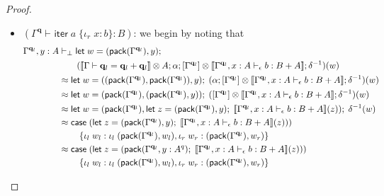 \documentclass[acmsmall,screen,review]{acmart}
\newcommand{\mb}[1]{\ensuremath{\mathbf{#1}}}
\newcommand{\ms}[1]{\ensuremath{\mathsf{#1}}}
\newcommand{\lto}{:}
\newcommand{\linl}[1]{\iota_l\;{#1}}
\newcommand{\linr}[1]{\iota_r\;{#1}}
\newcommand{\letexpr}[3]{\ensuremath{\ms{let}\;#1 = #2;\;#3}}
\newcommand{\caseexpr}[5]{\ms{case}\;#1\;\{\linl{#2} \lto #3, \linr{#4} \lto #5\}}
\newcommand{\liter}[3]{\ms{iter}\;#1\;\{ \linr{#2} \lto #3 \}}
\newcommand{\qsp}[4]{#1 \vdash #2 = #3 + #4}
\newcommand{\hasty}[4]{#1 \vdash_{#2} #3: {#4}}
\newcommand{\dnt}[1]{\llbracket{#1}\rrbracket}
\begin{document}
\begin{proof}
\begin{itemize}
    \item $(\hasty{\Gamma^{\mb{q}}}{}{\liter{a}{x}{b}}{B})$: we begin by noting that
    \begin{align*}
    \Gamma^{\mb{q}_l}, y : A &\vdash_\bot
      \letexpr{w}{(\ms{pack}(\Gamma^{\mb{q}_l}), y)}{ \\ & \qquad
        (
          \dnt{\qsp{\Gamma}{\mb{q}_l}{\mb{q}_l}{\mb{q}_l}} \otimes A 
          ; \alpha
          ; [\Gamma^{\mb{q}_l}] 
            \otimes \dnt{\hasty{\Gamma^{\mb{q}_l}, x : A}{\epsilon}{b}{B + A}}
          ; \delta^{-1}
        )(w)
      } \\
      &\approx
      \letexpr{w}{((\ms{pack}(\Gamma^{\mb{q}_l}), \ms{pack}(\Gamma^{\mb{q}_l})), y)}{ (
        \alpha
        ; [\Gamma^{\mb{q}_l}] 
          \otimes \dnt{\hasty{\Gamma^{\mb{q}_l}, x : A}{\epsilon}{b}{B + A}}
        ; \delta^{-1}
      )(w)} \\  
      &\approx
      \letexpr{w}{(\ms{pack}(\Gamma^{\mb{q}_l}), (\ms{pack}(\Gamma^{\mb{q}_l}), y))}{ (
        [\Gamma^{\mb{q}_l}] \otimes \dnt{\hasty{\Gamma^{\mb{q}_l}, x : A}{\epsilon}{b}{B + A}}
        ; \delta^{-1}
      )(w)} \\  
      &\approx
      \letexpr{w}{(\ms{pack}(\Gamma^{\mb{q}_l}), 
          \letexpr{z}{(\ms{pack}(\Gamma^{\mb{q}_l}), y)}
            {\dnt{\hasty{\Gamma^{\mb{q}_l}, x : A}{\epsilon}{b}{B + A}}(z)}
        )}{\delta^{-1}(w)} \\
      &\approx
      \caseexpr{(\letexpr{z}{(\ms{pack}(\Gamma^{\mb{q}_l}), y)}
            {\dnt{\hasty{\Gamma^{\mb{q}_l}, x : A}{\epsilon}{b}{B + A}}(z)}
        )) \\ & \qquad}{w_l}{\linl{(\ms{pack}(\Gamma^{\mb{q}_l}), w_l)}}
                       {w_r}{(\ms{pack}(\Gamma^{\mb{q}_l}), w_r)} \\
      &\approx
      \caseexpr{(\letexpr{z}{(\ms{pack}(\Gamma^{\mb{q}_l}, y : A^q)}
            {\dnt{\hasty{\Gamma^{\mb{q}_l}, x : A}{\epsilon}{b}{B + A}}(z)}
        )) \\ & \qquad}{w_l}{\linl{(\ms{pack}(\Gamma^{\mb{q}_l}), w_l)}}
                       {w_r}{(\ms{pack}(\Gamma^{\mb{q}_l}), w_r)} \\

\end{align*}
\end{itemize}
\end{proof}
\end{document}
